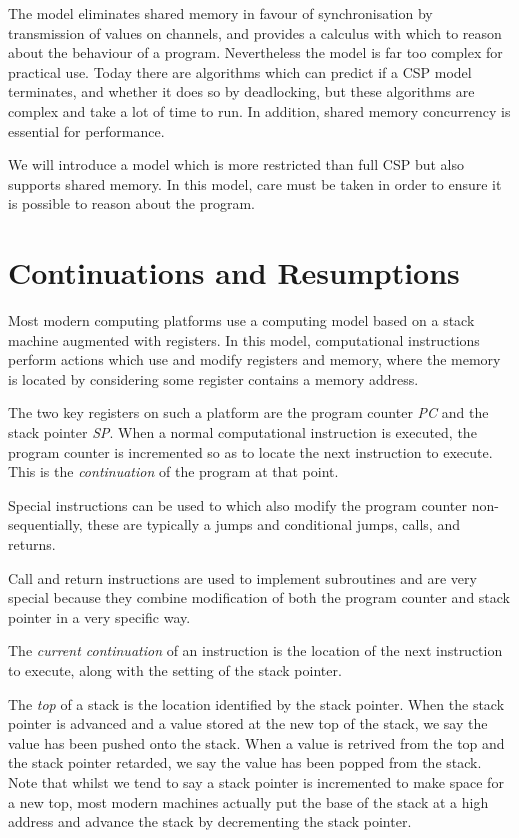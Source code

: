 \documentclass[oneside]{book}
\begin{document}
The model eliminates shared memory in favour of synchronisation by transmission
of values on channels, and provides a calculus with which to reason about the
behaviour of a program. Nevertheless the model is far too complex for practical
use. Today there are algorithms which can predict if a CSP model terminates,
and whether it does so by deadlocking, but these algorithms are complex and take
a lot of time to run. In addition, shared memory concurrency is essential for
performance.

We will introduce a model which is more restricted than full CSP but also supports
shared memory. In this model, care must be taken in order to ensure it is possible
to reason about the program.

\chapter{Continuations and Resumptions}
Most modern computing platforms use a computing model based on a stack machine
augmented with registers. In this model, computational instructions perform
actions which use and modify registers and memory, where the memory is located by
considering some register contains a memory address.

The two key registers on such a platform are the program counter {\em PC}
and the stack pointer {\em SP}. When a normal computational instruction
is executed, the program counter is incremented so as to locate the next
instruction to execute. This is the {\em continuation} of the program
at that point.

Special instructions can be used to which also modify the program counter
non-sequentially, these are typically a jumps and conditional jumps,
calls, and returns.

Call and return instructions are used to implement subroutines and are very
special because they combine modification of both the program counter
and stack pointer in a very specific way.

The {\em current continuation} of an instruction is the location of
the next instruction to execute, along with the setting of the stack
pointer.

The {\em top} of a stack is the location identified by the stack pointer.
When the stack pointer is advanced and a value stored at the new top
of the stack, we say the value has been pushed onto the stack.
When a value is retrived from the top and the stack pointer retarded,
we say the value has been popped from the stack. Note that whilst 
we tend to say a stack pointer is incremented to make space for a new
top, most modern machines actually put the base of the stack at a high
address and advance the stack by decrementing the stack pointer.
\end{document}
